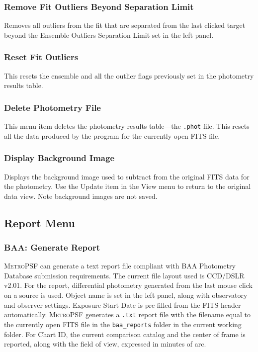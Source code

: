 \documentclass{article}
\begin{document}
\subsubsection{Remove Fit Outliers Beyond Separation Limit}
Removes all outliers from the fit that are separated from the last clicked target beyond the Ensemble Outliers Separation Limit set in the left panel. 

\subsubsection{Reset Fit Outliers}
This resets the ensemble and all the outlier flags previously set in the photometry results table. 

\subsubsection{Delete Photometry File}
This menu item deletes the photometry results table---the \texttt{.phot} file. This resets all the data produced by the program for the currently open FITS file. 
\subsubsection{Display Background Image}
Displays the background image used to subtract from the original FITS data for the photometry. Use the Update item in the View menu to return to the original data view. Note background images are not saved.

\subsection{Report Menu}
\subsubsection{BAA: Generate Report}
\label{baa}
\textsc{MetroPSF} can generate a text report file compliant with BAA Photometry Database submission requirements. The current file layout used is CCD/DSLR v2.01. For the report, differential photometry generated from the last mouse click on a source is used. Object name is set in the left panel, along with observatory and observer settings. Exposure Start Date is pre-filled from the FITS header automatically. \textsc{MetroPSF} generates a \texttt{.txt} report file with the filename equal to the currently open FITS file in the \texttt{baa\_reports} folder in the current working folder. For Chart ID, the current comparison catalog and the center of frame is reported, along with the field of view, expressed in minutes of arc. 
\end{document}
